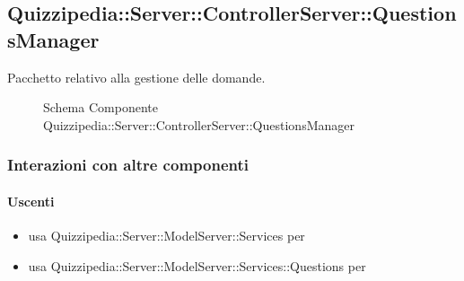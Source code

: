 \subsection{Quizzipedia::Server::ControllerServer::QuestionsManager}
Pacchetto relativo alla gestione delle domande.
\begin{figure}[H]
\centering
\noindent{}
\caption[Schema Componente Quizzipedia::Server::ControllerServer::QuestionsManager]{Schema Componente Quizzipedia::Server::ControllerServer::QuestionsManager}
\end{figure}
\subsubsection{Interazioni con altre componenti}
\paragraph{Uscenti}
\begin{itemize}
\item usa Quizzipedia::Server::ModelServer::Services per 
\item usa Quizzipedia::Server::ModelServer::Services::Questions per 
\end{itemize}
